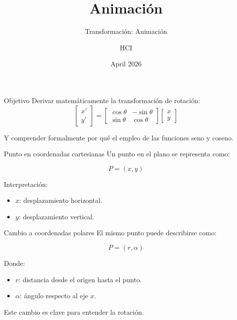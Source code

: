 \documentclass{beamer}
\title{Animación}
\subtitle{Transformación: Animación}
\author{HCI}
\date{April 2026}
\begin{document}
\begin{frame}
\titlepage
\end{frame}

\begin{frame}{Objetivo}
Derivar matemáticamente la transformación de rotación:
\[
\begin{bmatrix}
x' \\
y'
\end{bmatrix}
=
\begin{bmatrix}
\cos\theta & -\sin\theta \\
\sin\theta & \cos\theta
\end{bmatrix}
\begin{bmatrix}
x \\
y
\end{bmatrix}
\]

\medskip

Y comprender formalmente por qué el empleo de las funciones seno y coseno.
\end{frame}

\begin{frame}{Punto en coordenadas cartesianas}
Un punto en el plano se representa como:

\[
P = (x,y)
\]

\begin{center}
\end{center}

Interpretación:
\begin{itemize}
\item \(x\): desplazamiento horizontal.
\item \(y\): desplazamiento vertical.
\end{itemize}
\end{frame}

\begin{frame}{Cambio a coordenadas polares}
El mismo punto puede describirse como:

\[
P = (r,\alpha)
\]

Donde:

\begin{itemize}
\item \(r\): distancia desde el origen hasta el punto.
\item \(\alpha\): ángulo respecto al eje \(x\).
\end{itemize}

\medskip

Este cambio es clave para entender la rotación.
\end{frame}
\end{document}

